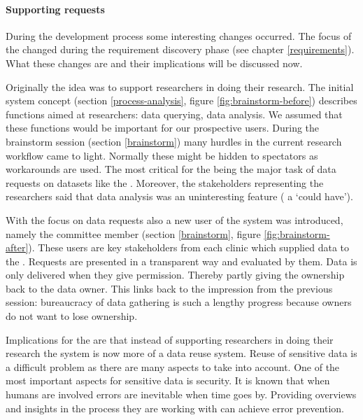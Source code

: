 \paragraph{Supporting requests}

During the development process some interesting changes occurred.
The focus of the \ivfsystem{} changed during the requirement discovery phase (see chapter \ref{requirements}).
What these changes are and their implications will be discussed now.

Originally the idea was to support researchers in doing their research.
The initial system concept (section \ref{process-analysis}, figure \ref{fig:brainstorm-before}) describes functions aimed at researchers: data querying, data analysis.
We assumed that these functions would be important for our prospective users.
During the brainstorm session (section \ref{brainstorm}) many hurdles in the current research workflow came to light.
Normally these might be hidden to spectators as workarounds are used.
The most critical for the \ivfsystem{} being the major task of data requests on datasets like the \projectdata{}.
Moreover, the stakeholders representing the researchers said that data analysis was an uninteresting feature (\ie{} a `could have').

With the focus on data requests also a new user of the system was introduced, namely the committee member (section \ref{brainstorm}, figure \ref{fig:brainstorm-after}).
These users are key stakeholders from each clinic which supplied data to the \projectdata{}.
Requests are presented in a transparent way and evaluated by them.
Data is only delivered when they give permission. 
Thereby partly giving the ownership back to the data owner.
This links back to the impression from the previous session: bureaucracy of data gathering is such a lengthy progress because owners do not want to lose ownership.

Implications for the \ivfsystem{} are that instead of supporting researchers in doing their research the system is now more of a data reuse system.
Reuse of sensitive data is a difficult problem as there are many aspects to take into account.
One of the most important aspects for sensitive data is security.
It is known that when humans are involved errors are inevitable when time goes by.
Providing overviews and insights in the process they are working with can achieve error prevention.

